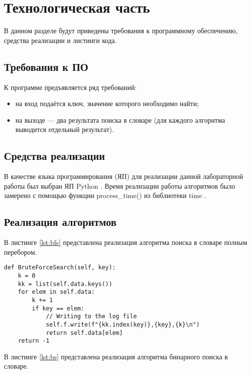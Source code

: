 \chapter{Технологическая часть}
В данном разделе будут приведены требования к программному обеспечению, средства реализации и листинги кода.

\section{Требования к ПО}

К программе предъявляется ряд требований:
\begin{itemize}[label = ---]
	\item на вход подаётся ключ, значение которого необходимо найти;
	\item на выходе --- два результата поиска в словаре (для каждого алгоритма выводится отдельный результат).
\end{itemize}

\section{Средства реализации}

В качестве языка программирования (ЯП) для реализации данной лабораторной работы был выбран ЯП Python \cite{pythonlang}. Время реализации работы алгоритмов было замерено с помощью функции
 process\_time() из библиотеки time \cite{pythonlangtime}. 

\section{Реализация алгоритмов}
В листинге \ref{lst:bfs} представлена реализация алгоритма поиска в словаре полным перебором.
\clearpage
\begin{center}
	\captionsetup{justification=raggedright,singlelinecheck=off}
	
\begin{lstlisting}[label=lst:bfs,caption=Реализация алгоритма поиска полным перебором]
def BruteForceSearch(self, key):
	k = 0
	kk = list(self.data.keys())
	for elem in self.data:
		k += 1
		if key == elem:
			// Writing to the log file 
			self.f.write(f"{kk.index(key)},{key},{k}\n") 
			return self.data[elem]
	return -1
\end{lstlisting}
\end{center}

В листинге \ref{lst:bs} представлена реализация алгоритма бинарного поиска в словаре.


